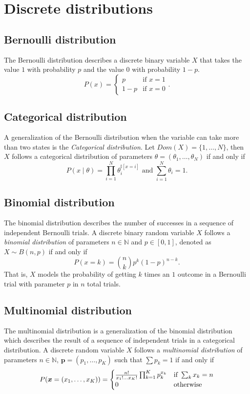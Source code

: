\section{Discrete distributions}

\subsection*{Bernoulli distribution}

The Bernoulli distribution describes a discrete binary variable \(X\) that takes
the value \(1\)  with probability \(p\) and the value \(0\)  with probability \(1-p\).
\[
  P(x) =
\left\{
  \begin{array}{ll}
    p  & \mbox{if } x = 1 \\
    1-p & \mbox{if } x = 0
  \end{array}.
\right.
\]

\subsection*{Categorical distribution}

A generalization of the Bernoulli distribution when the variable can take more than two states is the \emph{Categorical distribution}. Let \(Dom(X) = \{1,\dots,N\}\), then \(X\) follows a categorical distribution of parameters \(\theta = (\theta_{1},\dots, \theta_{N})\) if and only if
\[
  P(x \mid \theta) = \prod_{i=1}^{N}\theta_{i}^{\mathbb{I}[x = i]} \text{ and } \sum_{i = 1}^{N}\theta_{i} = 1.
\]

\subsection*{Binomial distribution}

The binomial distribution describes the number of successes in a sequence of
independent Bernoulli trials. A discrete binary random variable \(X\) follows a
\emph{binomial distribution} of parameters \(n \in \mathbb{N}\) and \(p \in
[0,1]\), denoted as \(X \sim B(n, p)\) if and only if
\[
  P(x = k) = \binom{n}{k}p^k{(1-p)}^{n-k}.
\]
That is, \(X\) models the probability of getting \(k\) times an \(1\) outcome in a Bernoulli trial with parameter \(p\) in \(n\) total trials.


\subsection*{Multinomial distribution}
The multinomial distribution is a generalization of the binomial distribution which describes the result of a sequence of independent trials in a categorical distribution. A discrete random variable \(X\) follows a \emph{multinomial distribution} of parameters \(n \in \mathbb{N}\), \(\bm{p} = (p_{1},\dots,p_{K})\) such that \(\sum p_{k} = 1\)  if and only if
\[
  P(\bm{x} =(x_{1},\dots,x_{K})) =
  \begin{cases}
    \frac{n!}{x_{1}!\dots x_{K}!}\prod_{k=1}^{K}p_{k}^{x_{k}} & \text{if } \sum_{k}{x_{k}} = n\\
    0 & \text{otherwise}
  \end{cases}
\]

